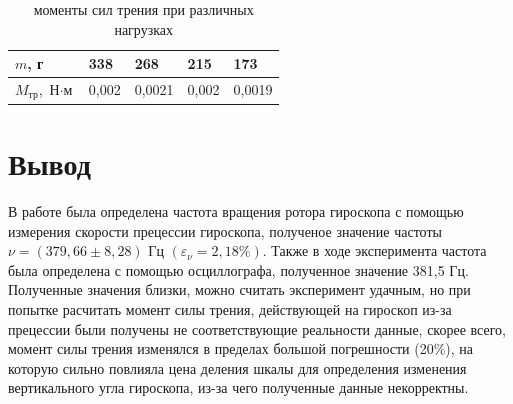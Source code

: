 \documentclass[a4paper, 12pt]{article}
\begin{document}
\begin{table}[!ht]
    \centering
    \begin{tabular}{|l|l|l|l|l|}
    \hline
        $m$, г & 338 & 268 & 215 & 173 \\ \hline
        $M_{\text{тр}}$, $\text{Н}\cdot\text{м}$ & 0,002 & 0,0021 & 0,002 & 0,0019 \\ \hline
    \end{tabular}
    \caption{моменты сил трения при различных нагрузках}
\end{table}

\section*{Вывод}

В работе была определена частота вращения ротора гироскопа с помощью измерения скорости прецессии гироскопа, полученое значение частоты $ \nu = (379,66 \pm 8,28) \text{ Гц } (\varepsilon_{\nu} = 2,18 \%)$. Также в ходе эксперимента частота была определена с помощью осциллографа, полученное значение 381,5 Гц. Полученные значения близки, можно считать эксперимент удачным, но при попытке расчитать момент силы трения, действующей на гироскоп из-за прецессии были получены не соответствующие реальности данные, скорее всего, момент силы трения изменялся в пределах большой погрешности (20\%), на которую сильно повлияла цена деления шкалы для определения изменения вертикального угла гироскопа, из-за чего полученные данные некорректны.
\end{document}
